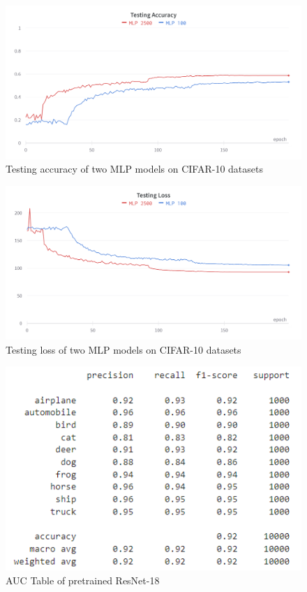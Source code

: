 \documentclass[twocolumn]{extarticle}
\begin{document}
\begin{appendices}
\begin{figure}[H]
\centering
\includegraphics[width=0.9\linewidth]{charts/mlp_cifar_10_test_acc}
\caption{Testing accuracy of two MLP models on CIFAR-10 datasets}
\label{chart: mlp_3}
\end{figure}

\begin{figure}[H]
\centering
\includegraphics[width=0.9\linewidth]{charts/mlp_cifar_10_test_loss}
\caption{Testing loss of two MLP models on CIFAR-10 datasets}
\label{chart: mlp_4}
\end{figure}

\begin{figure}[H]
\centering
\includegraphics[width=0.9\linewidth]{charts/resnet-cifar-auc}
\caption{AUC Table of pretrained ResNet-18}
\label{chart:resnet-cifar-auc}
\end{figure}


\end{appendices}
\end{document}
